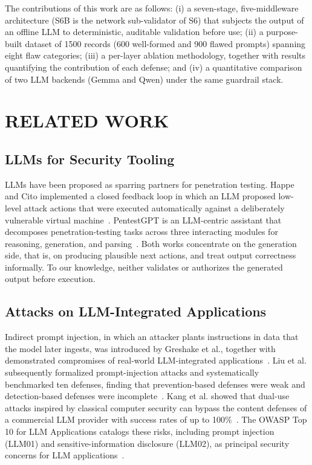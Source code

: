 \documentclass[a4paper,twoside]{article}
\begin{document}
The contributions of this work are as follows: (i) a seven-stage, five-middleware architecture (S6B is the network sub-validator of S6) that subjects the output of an offline LLM to deterministic, auditable validation before use; (ii) a purpose-built dataset of 1500 records (600 well-formed and 900 flawed prompts) spanning eight flaw categories; (iii) a per-layer ablation methodology, together with results quantifying the contribution of each defense; and (iv) a quantitative comparison of two LLM backends (Gemma and Qwen) under the same guardrail stack.


\section{\uppercase{Related Work}}
\label{sec:related}

\subsection{LLMs for Security Tooling}

\noindent LLMs have been proposed as sparring partners for penetration testing. Happe and Cito implemented a closed feedback loop in which an LLM proposed low-level attack actions that were executed automatically against a deliberately vulnerable virtual machine~\cite{Happe23}. PentestGPT is an LLM-centric assistant that decomposes penetration-testing tasks across three interacting modules for reasoning, generation, and parsing~\cite{Deng24}. Both works concentrate on the generation side, that is, on producing plausible next actions, and treat output correctness informally. To our knowledge, neither validates or authorizes the generated output before execution.

\subsection{Attacks on LLM-Integrated Applications}

\noindent Indirect prompt injection, in which an attacker plants instructions in data that the model later ingests, was introduced by Greshake et al., together with demonstrated compromises of real-world LLM-integrated applications~\cite{Greshake23}. Liu et al. subsequently formalized prompt-injection attacks and systematically benchmarked ten defenses, finding that prevention-based defenses were weak and detection-based defenses were incomplete~\cite{Liu23}. Kang et al. showed that dual-use attacks inspired by classical computer security can bypass the content defenses of a commercial LLM provider with success rates of up to 100\%~\cite{Kang24}. The OWASP Top 10 for LLM Applications catalogs these risks, including prompt injection (LLM01) and sensitive-information disclosure (LLM02), as principal security concerns for LLM applications~\cite{OWASP25}.
\end{document}
